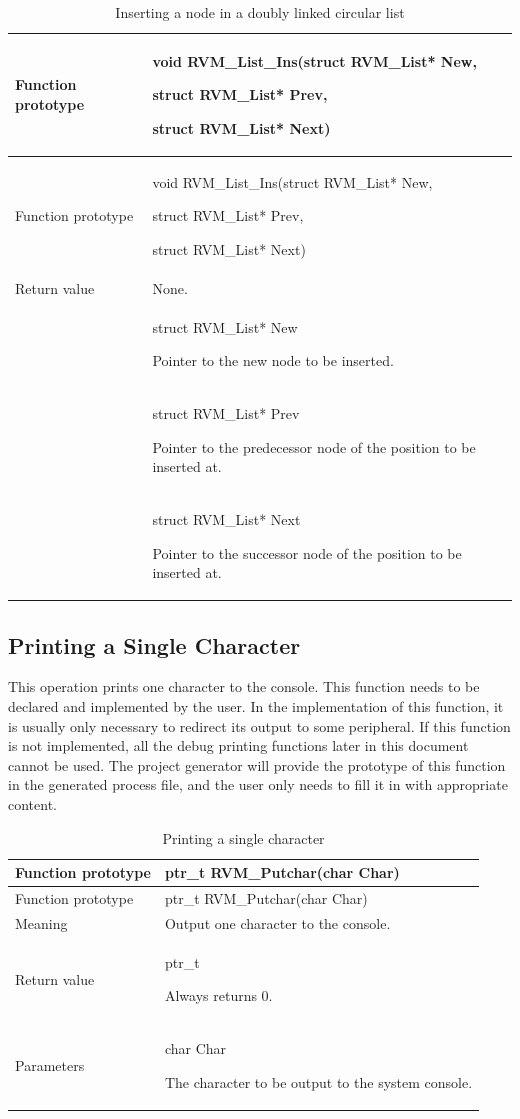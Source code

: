 \begin{xltabular}{\textwidth}{@{}>{\hsize\raggedright\arraybackslash}X>{\hsize\raggedright\arraybackslash}X@{}}
\caption{Inserting a node in a doubly linked circular list}\label{tab:3-17}\\
\toprule
Function prototype\strut
 & void RVM\_\allowbreak{}List\_\allowbreak{}Ins(struct RVM\_\allowbreak{}List* New,

struct RVM\_\allowbreak{}List* Prev,

struct RVM\_\allowbreak{}List* Next)\strut
\tabularnewline
\endfirsthead
\toprule
Function prototype\strut
 & void RVM\_\allowbreak{}List\_\allowbreak{}Ins(struct RVM\_\allowbreak{}List* New,

struct RVM\_\allowbreak{}List* Prev,

struct RVM\_\allowbreak{}List* Next)\strut
\tabularnewline
\midrule
\endhead
\bottomrule
\endlastfoot
Return value & None.\tabularnewline
{} & struct RVM\_\allowbreak{}List* New

Pointer to the new node to be inserted.\strut
\tabularnewline
\strut
 & struct RVM\_\allowbreak{}List* Prev

Pointer to the predecessor node of the position to be inserted at.\strut
\tabularnewline
\strut
 & struct RVM\_\allowbreak{}List* Next

Pointer to the successor node of the position to be inserted at.\strut
\tabularnewline
\end{xltabular}

\subsection{Printing a Single Character}\label{subsec:3-6-5}

This operation prints one character to the console. This function needs to be declared and implemented by the user. In the implementation of this function, it is usually only necessary to redirect its output to some peripheral. If this function is not implemented, all the debug printing functions later in this document cannot be used. The project generator will provide the prototype of this function in the generated process file, and the user only needs to fill it in with appropriate content.

\begin{xltabular}{\textwidth}{@{}>{\hsize\raggedright\arraybackslash}X>{\hsize\raggedright\arraybackslash}X@{}}
\caption{Printing a single character}\label{tab:3-18}\\
\toprule
Function prototype & ptr\_\allowbreak{}t RVM\_\allowbreak{}Putchar(char Char)\tabularnewline
\endfirsthead
\toprule
Function prototype & ptr\_\allowbreak{}t RVM\_\allowbreak{}Putchar(char Char)\tabularnewline
\midrule
\endhead
\bottomrule
\endlastfoot
Meaning & Output one character to the console.\tabularnewline
Return value\strut
 & ptr\_\allowbreak{}t

Always returns 0.\strut
\tabularnewline
Parameters\strut
 & char Char

The character to be output to the system console.\strut
\tabularnewline
\end{xltabular}

